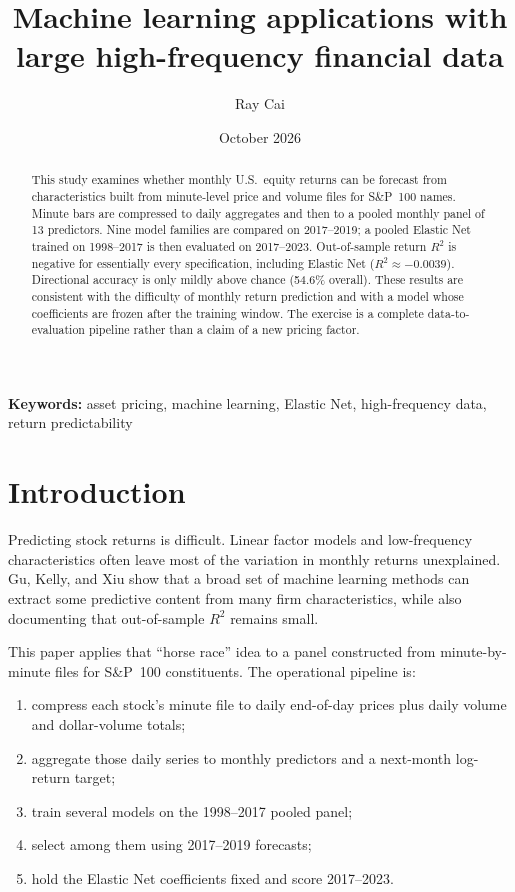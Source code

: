 \documentclass[11pt,twocolumn]{article}
\title{Machine learning applications with large high-frequency financial data}
\author{Ray Cai}
\date{October 2026}
\begin{document}
\maketitle

\begin{abstract}
This study examines whether monthly U.S.\ equity returns can be forecast from characteristics built from minute-level price and volume files for S\&P~100 names. Minute bars are compressed to daily aggregates and then to a pooled monthly panel of 13 predictors. Nine model families are compared on 2017--2019; a pooled Elastic Net trained on 1998--2017 is then evaluated on 2017--2023. Out-of-sample return $R^2$ is negative for essentially every specification, including Elastic Net ($R^2 \approx -0.0039$). Directional accuracy is only mildly above chance (54.6\% overall). These results are consistent with the difficulty of monthly return prediction and with a model whose coefficients are frozen after the training window. The exercise is a complete data-to-evaluation pipeline rather than a claim of a new pricing factor.
\end{abstract}

\noindent\textbf{Keywords:} asset pricing, machine learning, Elastic Net, high-frequency data, return predictability

\section{Introduction}

Predicting stock returns is difficult. Linear factor models and low-frequency characteristics often leave most of the variation in monthly returns unexplained. Gu, Kelly, and Xiu \citep{GuKellyXiu2020} show that a broad set of machine learning methods can extract some predictive content from many firm characteristics, while also documenting that out-of-sample $R^2$ remains small.

This paper applies that ``horse race'' idea to a panel constructed from minute-by-minute files for S\&P~100 constituents. The operational pipeline is:
\begin{enumerate}
    \item compress each stock's minute file to daily end-of-day prices plus daily volume and dollar-volume totals;
    \item aggregate those daily series to monthly predictors and a next-month log-return target;
    \item train several models on the 1998--2017 pooled panel;
    \item select among them using 2017--2019 forecasts;
    \item hold the Elastic Net coefficients fixed and score 2017--2023.
\end{enumerate}
\end{document}
